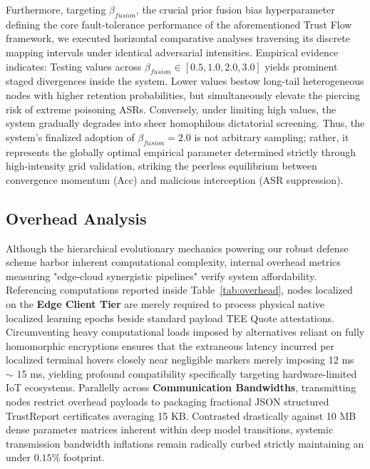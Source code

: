 \documentclass[runningheads]{llncs}
\begin{document}
Furthermore, targeting $\beta_{fusion}$, the crucial prior fusion bias hyperparameter defining the core fault-tolerance performance of the aforementioned Trust Flow framework, we executed horizontal comparative analyses traversing its discrete mapping intervals under identical adversarial intensities. Empirical evidence indicates: Testing values across $\beta_{fusion} \in [0.5, 1.0, 2.0, 3.0]$ yields prominent staged divergences inside the system. Lower values bestow long-tail heterogeneous nodes with higher retention probabilities, but simultaneously elevate the piercing risk of extreme poisoning ASRs. Conversely, under limiting high values, the system gradually degrades into sheer homophilous dictatorial screening. Thus, the system's finalized adoption of $\beta_{fusion} = 2.0$ is not arbitrary sampling; rather, it represents the globally optimal empirical parameter determined strictly through high-intensity grid validation, striking the peerless equilibrium between convergence momentum (Acc) and malicious interception (ASR suppression).

\subsection{Overhead Analysis}
Although the hierarchical evolutionary mechanics powering our robust defense scheme harbor inherent computational complexity, internal overhead metrics measuring "edge-cloud synergistic pipelines" verify system affordability. Referencing computations reported inside Table~\ref{tab:overhead}, nodes localized on the \textbf{Edge Client Tier} are merely required to process physical native localized learning epochs beside standard payload TEE Quote attestations. Circumventing heavy computational loads imposed by alternatives reliant on fully homomorphic encryptions ensures that the extraneous latency incurred per localized terminal hovers closely near negligible markers merely imposing 12 ms $\sim$ 15 ms, yielding profound compatibility specifically targeting hardware-limited IoT ecosystems. Parallelly across \textbf{Communication Bandwidths}, transmitting nodes restrict overhead payloads to packaging fractional JSON structured TrustReport certificates averaging 15 KB. Contrasted drastically against 10 MB dense parameter matrices inherent within deep model transitions, systemic transmission bandwidth inflations remain radically curbed strictly maintaining an under $0.15\%$ footprint.
\end{document}
